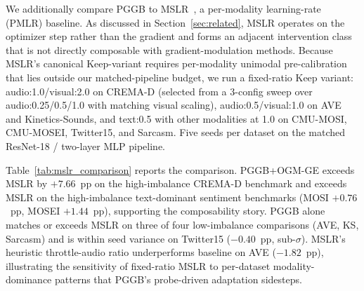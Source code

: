 \documentclass{article} %
\begin{document}
We additionally compare PGGB to MSLR~\citep{yao2022mslr}, a per-modality learning-rate (PMLR) baseline. As discussed in Section~\ref{sec:related}, MSLR operates on the optimizer step rather than the gradient and forms an adjacent intervention class that is not directly composable with gradient-modulation methods. Because MSLR's canonical Keep-variant requires per-modality unimodal pre-calibration that lies outside our matched-pipeline budget, we run a fixed-ratio Keep variant: audio:1.0/visual:2.0 on CREMA-D (selected from a 3-config sweep over audio:0.25/0.5/1.0 with matching visual scaling), audio:0.5/visual:1.0 on AVE and Kinetics-Sounds, and text:0.5 with other modalities at 1.0 on CMU-MOSI, CMU-MOSEI, Twitter15, and Sarcasm. Five seeds per dataset on the matched ResNet-18 / two-layer MLP pipeline.

Table~\ref{tab:mslr_comparison} reports the comparison. PGGB+OGM-GE exceeds MSLR by $+7.66$~pp on the high-imbalance CREMA-D benchmark and exceeds MSLR on the high-imbalance text-dominant sentiment benchmarks (MOSI $+0.76$~pp, MOSEI $+1.44$~pp), supporting the composability story. PGGB alone matches or exceeds MSLR on three of four low-imbalance comparisons (AVE, KS, Sarcasm) and is within seed variance on Twitter15 ($-0.40$~pp, sub-$\sigma$). MSLR's heuristic throttle-audio ratio underperforms baseline on AVE ($-1.82$~pp), illustrating the sensitivity of fixed-ratio MSLR to per-dataset modality-dominance patterns that PGGB's probe-driven adaptation sidesteps.
\end{document}
